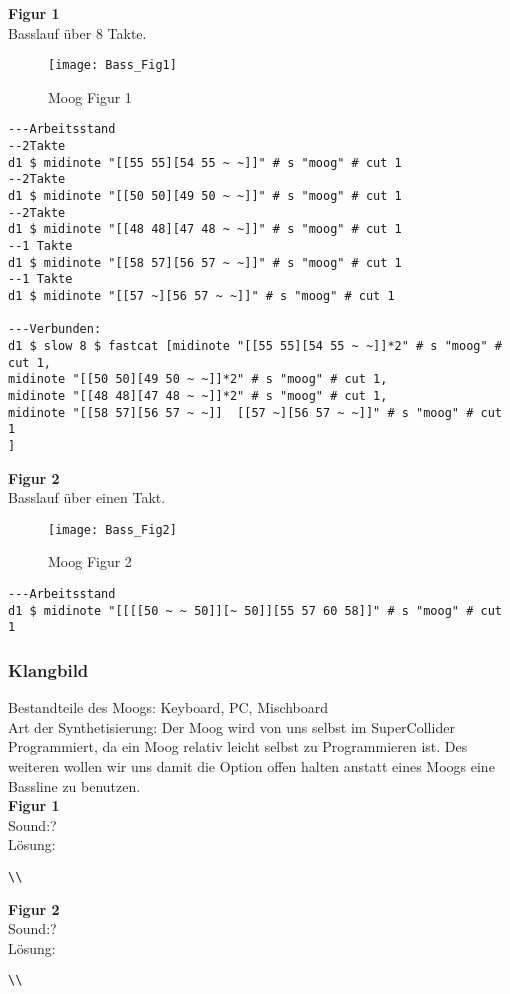 \documentclass[
10pt, %
a4paper, %
oneside, %
headinclude,footinclude, %
BCOR5mm, %
]{scrartcl}
\begin{document}
\noindent\textbf{Figur 1}\\
Basslauf über 8 Takte.\\
\begin{figure}[h]
	\centering 
	\texttt{[image: Bass\_Fig1]} 
	\caption{Moog Figur 1}
\end{figure}

\begin{lstlisting}
---Arbeitsstand
--2Takte
d1 $ midinote "[[55 55][54 55 ~ ~]]" # s "moog" # cut 1
--2Takte
d1 $ midinote "[[50 50][49 50 ~ ~]]" # s "moog" # cut 1
--2Takte
d1 $ midinote "[[48 48][47 48 ~ ~]]" # s "moog" # cut 1
--1 Takte
d1 $ midinote "[[58 57][56 57 ~ ~]]" # s "moog" # cut 1
--1 Takte
d1 $ midinote "[[57 ~][56 57 ~ ~]]" # s "moog" # cut 1

---Verbunden:
d1 $ slow 8 $ fastcat [midinote "[[55 55][54 55 ~ ~]]*2" # s "moog" # cut 1,
midinote "[[50 50][49 50 ~ ~]]*2" # s "moog" # cut 1,
midinote "[[48 48][47 48 ~ ~]]*2" # s "moog" # cut 1,
midinote "[[58 57][56 57 ~ ~]]  [[57 ~][56 57 ~ ~]]" # s "moog" # cut 1
]
\end{lstlisting}

\noindent\textbf{Figur 2}\\
Basslauf über einen Takt.
\begin{figure}[h]
	\centering 
	\texttt{[image: Bass\_Fig2]} 
	\caption{Moog Figur 2}
\end{figure}

\begin{lstlisting}
---Arbeitsstand
d1 $ midinote "[[[[50 ~ ~ 50]][~ 50]][55 57 60 58]]" # s "moog" # cut 1
\end{lstlisting}



\subsubsection{Klangbild}
Bestandteile des Moogs: Keyboard, PC, Mischboard\\
Art der Synthetisierung: Der Moog wird von uns selbst im SuperCollider Programmiert, da ein Moog relativ leicht selbst zu Programmieren ist.
Des weiteren wollen wir uns damit die Option offen halten anstatt eines Moogs eine Bassline zu benutzen.\\
\noindent\textbf{Figur 1}\\
Sound:?\\
Lösung:\\
\begin{lstlisting}
\\
\end{lstlisting}
\noindent\textbf{Figur 2}\\
Sound:?\\
Lösung:\\
\begin{lstlisting}
\\
\end{lstlisting}
\end{document}
